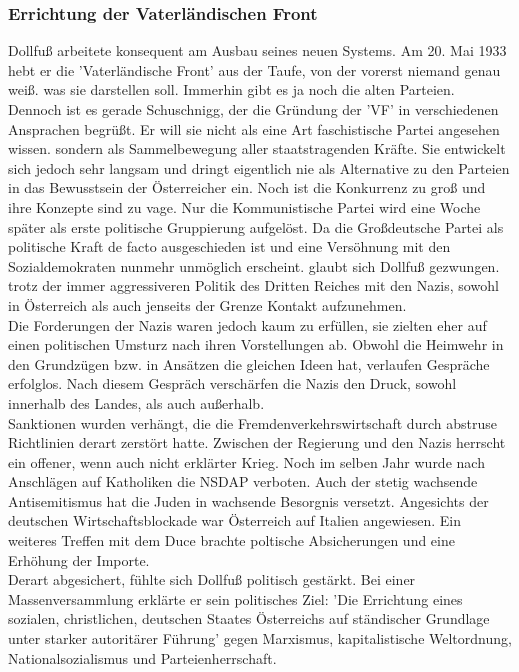 \documentclass[letterpaper, 12pt]{article}
\let\tempsubsubsection\subsubsection
\renewcommand\subsubsection[1]{\vspace{0cm}\tempsubsubsection{#1}\vspace{0cm}}
\begin{document}
\subsubsection{Errichtung der Vaterländischen Front}
Dollfuß arbeitete konsequent am Ausbau seines neuen Systems. Am 20. Mai 1933 hebt er die 'Vaterländische Front' aus der
Taufe, von der vorerst niemand genau weiß. was sie darstellen
soll. Immerhin gibt es ja noch die alten Parteien. Dennoch ist es
gerade Schuschnigg, der die Gründung der 'VF' in verschiedenen Ansprachen begrüßt. Er will sie nicht als eine Art faschistische Partei angesehen wissen. sondern als Sammelbewegung aller staatstragenden Kräfte. Sie entwickelt sich jedoch sehr langsam und dringt eigentlich nie als Alternative zu den Parteien in
das Bewusstsein der Österreicher ein. Noch ist die Konkurrenz zu
groß und ihre Konzepte sind zu vage. Nur die Kommunistische
Partei wird eine Woche später als erste politische Gruppierung
aufgelöst.
Da die Großdeutsche Partei als politische Kraft de facto ausgeschieden ist und eine Versöhnung mit den Sozialdemokraten
nunmehr unmöglich erscheint. glaubt sich Dollfuß gezwungen.
trotz der immer aggressiveren Politik des Dritten Reiches mit
den Nazis, sowohl in Österreich als auch jenseits der Grenze
Kontakt aufzunehmen. \\
Die Forderungen der Nazis waren jedoch kaum zu erfüllen, sie zielten eher auf einen politischen Umsturz nach ihren Vorstellungen ab. Obwohl die Heimwehr in den Grundzügen bzw. in Ansätzen die gleichen Ideen hat, verlaufen Gespräche erfolglos. Nach diesem Gespräch verschärfen die Nazis den Druck, sowohl innerhalb des Landes, als auch außerhalb. \\
Sanktionen wurden verhängt, die die Fremdenverkehrswirtschaft durch abstruse Richtlinien derart zerstört hatte. Zwischen der Regierung und den Nazis herrscht ein offener, wenn auch nicht erklärter Krieg. Noch im selben Jahr wurde nach Anschlägen auf Katholiken die NSDAP verboten. Auch der stetig wachsende Antisemitismus hat die Juden in wachsende Besorgnis versetzt. Angesichts der deutschen Wirtschaftsblockade war Österreich auf Italien angewiesen. Ein weiteres Treffen mit dem Duce brachte poltische Absicherungen und eine Erhöhung der Importe. \\
Derart abgesichert, fühlte sich Dollfuß politisch gestärkt. Bei einer Massenversammlung erklärte er sein politisches Ziel: 'Die Errichtung eines sozialen, christlichen, deutschen Staates Österreichs auf ständischer Grundlage unter starker autoritärer Führung' gegen Marxismus, kapitalistische Weltordnung, Nationalsozialismus und Parteienherrschaft.
\end{document}

